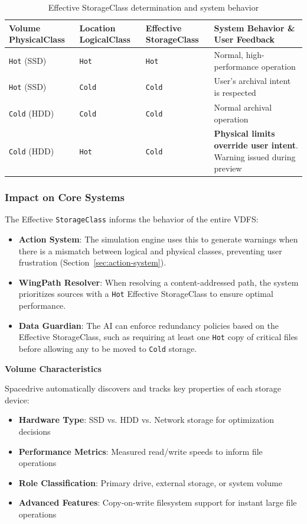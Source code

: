 \documentclass[sigconf]{acmart}
\begin{document}
\begin{table}[h]
\centering
\begin{tabular}{@{}lllp{2cm}@{}}
\toprule
\textbf{Volume PhysicalClass} & \textbf{Location LogicalClass} & \textbf{Effective StorageClass} & \textbf{System Behavior \& User Feedback} \\
\midrule
\texttt{Hot} (SSD) & \texttt{Hot} & \texttt{Hot} & Normal, high-performance operation \\
\texttt{Hot} (SSD) & \texttt{Cold} & \texttt{Cold} & User's archival intent is respected \\
\texttt{Cold} (HDD) & \texttt{Cold} & \texttt{Cold} & Normal archival operation \\
\texttt{Cold} (HDD) & \texttt{Hot} & \texttt{Cold} & \textbf{Physical limits override user intent}. Warning issued during preview \\
\bottomrule
\end{tabular}
\caption{Effective StorageClass determination and system behavior}
\label{tab:storage-class-resolution}
\end{table}

\subsubsection{Impact on Core Systems}
The Effective \texttt{StorageClass} informs the behavior of the entire VDFS:
\begin{itemize}[noitemsep, topsep=0pt]
 \item \textbf{Action System}: The simulation engine uses this to generate warnings when there is a mismatch between logical and physical classes, preventing user frustration (Section~\ref{sec:action-system}).
 \item \textbf{WingPath Resolver}: When resolving a content-addressed path, the system prioritizes sources with a \texttt{Hot} Effective StorageClass to ensure optimal performance.
 \item \textbf{Data Guardian}: The AI can enforce redundancy policies based on the Effective StorageClass, such as requiring at least one \texttt{Hot} copy of critical files before allowing any to be moved to \texttt{Cold} storage.
\end{itemize}


\textbf{Volume Characteristics}

Spacedrive automatically discovers and tracks key properties of each storage device:

\begin{itemize}[noitemsep, topsep=0pt]
 \item \textbf{Hardware Type}: SSD vs. HDD vs. Network storage for optimization decisions
 \item \textbf{Performance Metrics}: Measured read/write speeds to inform file operations
 \item \textbf{Role Classification}: Primary drive, external storage, or system volume
 \item \textbf{Advanced Features}: Copy-on-write filesystem support for instant large file operations
\end{itemize}
\end{document}
